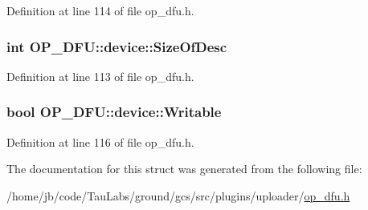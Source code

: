 \-Definition at line 114 of file op\-\_\-dfu.\-h.

\hypertarget{struct_o_p___d_f_u_1_1device_af5032c18eb9777d1537ae89d28426567}{
\subsubsection[{\-Size\-Of\-Desc}]{\setlength{\rightskip}{0pt plus 5cm}int {\bf \-O\-P\-\_\-\-D\-F\-U\-::device\-::\-Size\-Of\-Desc}}}\label{struct_o_p___d_f_u_1_1device_af5032c18eb9777d1537ae89d28426567}


\-Definition at line 113 of file op\-\_\-dfu.\-h.

\hypertarget{struct_o_p___d_f_u_1_1device_adf6e576700c6b3bb81fab16a4627d476}{
\subsubsection[{\-Writable}]{\setlength{\rightskip}{0pt plus 5cm}bool {\bf \-O\-P\-\_\-\-D\-F\-U\-::device\-::\-Writable}}}\label{struct_o_p___d_f_u_1_1device_adf6e576700c6b3bb81fab16a4627d476}


\-Definition at line 116 of file op\-\_\-dfu.\-h.



\-The documentation for this struct was generated from the following file\-:\begin{DoxyCompactItemize}
\item 
/home/jb/code/\-Tau\-Labs/ground/gcs/src/plugins/uploader/\hyperlink{op__dfu_8h}{op\-\_\-dfu.\-h}\end{DoxyCompactItemize}
